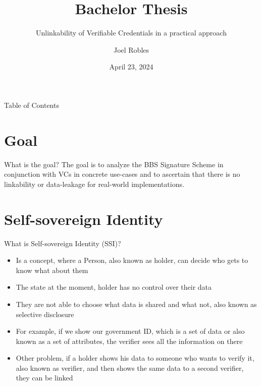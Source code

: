 \documentclass[
	english,%
	authorontitle=true,
	]{bfhbeamer}
\title{Bachelor Thesis}
\subtitle{Unlinkability of Verifiable Credentials in a practical approach}
\author[J. Robles]{Joel Robles}
\institute{TI}
\date{April 23, 2024}
\begin{document}
\maketitle

\begin{frame}{Table of Contents}
    \tableofcontents
\end{frame}

\section{Goal}

\begin{frame}{What is the goal?}
    The goal is to analyze the BBS Signature Scheme in conjunction with VCs in concrete use-cases and to ascertain that there is no linkability or data-leakage for real-world implementations.
\end{frame}

\section{Self-sovereign Identity}

\begin{frame}{What is Self-sovereign Identity (SSI)?}
    \begin{itemize}
        \item Is a concept, where a Person, also known as holder, can decide who gets to know what about them
        \item The state at the moment, holder has no control over their data
        \item They are not able to choose what data is shared and what not, also known as selective disclosure
        \item For example, if we show our government ID, which is a set of data or also known as a set of attributes, the verifier sees all the information on there
        \item Other problem, if a holder shows his data to someone who wants to verify it, also known as verifier, and then shows the same data to a second verifier, they can be linked
    \end{itemize}
\end{frame}
\end{document}
